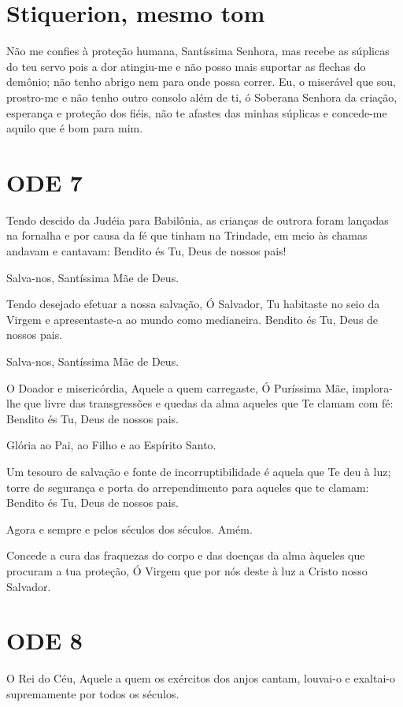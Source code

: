 \documentclass{subfiles}
\begin{document}
\section*{Stiquerion, mesmo tom}

Não me confies à proteção humana, Santíssima Senhora, mas recebe
as súplicas do teu servo pois a dor atingiu-me e não posso mais suportar as
flechas do demônio; não tenho abrigo nem para onde possa correr. Eu, o
miserável que sou, prostro-me e não tenho outro consolo além de ti, ó
Soberana Senhora da criação, esperança e proteção dos fiéis, não te afastes
das minhas súplicas e concede-me aquilo que é bom para mim.

\section*{ODE 7}

\eirmos{}Tendo descido da Judéia para Babilônia, as crianças de outrora
foram lançadas na fornalha e por causa da fé que tinham na Trindade, em meio
às chamas andavam e cantavam: Bendito és Tu, Deus de nossos pais!

Salva-nos, Santíssima Mãe de Deus.

Tendo desejado efetuar a nossa salvação, Ó Salvador, Tu habitaste no
seio da Virgem e apresentaste-a ao mundo como medianeira. Bendito és Tu,
Deus de nossos pais.

Salva-nos, Santíssima Mãe de Deus.

O Doador e misericórdia, Aquele a quem carregaste, Ó Puríssima Mãe,
implora-lhe que livre das transgressões e quedas da alma aqueles que Te
clamam com fé: Bendito és Tu, Deus de nossos pais.

Glória ao Pai, ao Filho e ao Espírito Santo.

Um tesouro de salvação e fonte de incorruptibilidade é aquela que Te
deu à luz; torre de segurança e porta do arrependimento para aqueles que te
clamam: Bendito és Tu, Deus de nossos pais.

Agora e sempre e pelos séculos dos séculos. Amém.

Concede a cura das fraquezas do corpo e das doenças da alma àqueles
que procuram a tua proteção, Ó Virgem que por nós deste à luz a Cristo nosso
Salvador.

\section*{ODE 8}

\eirmos{}O Rei do Céu, Aquele a quem os exércitos dos anjos cantam,
louvai-o e exaltai-o supremamente por todos os séculos.
\end{document}
